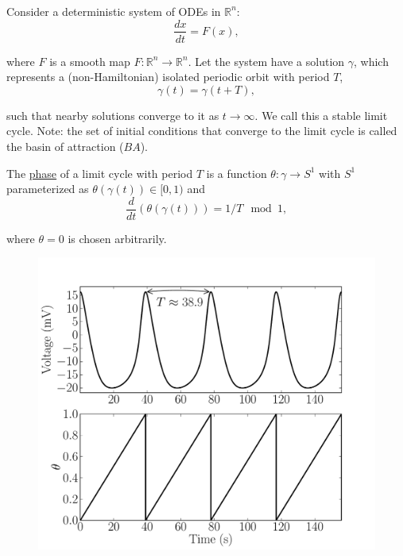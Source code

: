 \documentclass{beamer}
\begin{document}
\begin{frame}
\frametitle{\insertsection}
  \framesubtitle{\insertsubsection}
  Consider a deterministic system of ODEs in $\mathbb{R}^n$:
  \begin{equation}
  \frac{dx}{dt} = F(x),
  \end{equation}

  where $F$ is a smooth map $F:\mathbb{R}^n \rightarrow \mathbb{R}^n$. Let the system have a solution $\gamma$, which represents a (non-Hamiltonian) isolated periodic orbit with period $T$,
  \begin{equation}
  \gamma(t) = \gamma(t+T),
  \end{equation}

  such that nearby solutions converge to it as $t \rightarrow \infty$.  We call this a stable limit cycle.  Note: the set of initial conditions that converge to the limit cycle is called the basin of attraction ($BA$).

  
  

\end{frame}


\begin{frame}

  \begin{definition} The \underline{phase} of a limit cycle with period $T$ is a function $\theta: \gamma \rightarrow S^1$ with $S^1$ parameterized as $\theta(\gamma(t)) \in [0,1)$ and
  \begin{equation}
  \frac{d }{dt}\left (\theta(\gamma(t)) \right ) = 1/T \mod 1,
  \end{equation}
  \end{definition}
  where $\theta = 0$ is chosen arbitrarily.


\end{frame}

\begin{frame}
   \begin{figure}
   \includegraphics[width=\textwidth]{dthetadt_fig.pdf}
  \end{figure}

\end{frame}
\end{document}
